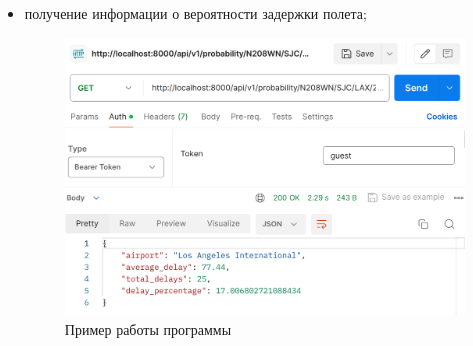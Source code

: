 \begin{itemize}
    \item получение информации о вероятности задержки полета;
    \begin{figure}[H]
              \centering
              \includegraphics[scale=0.2]{inc/example_probability}
              \caption{Пример работы программы}
              \label{fig:example_probability}
    \end{figure}
\end{itemize}

